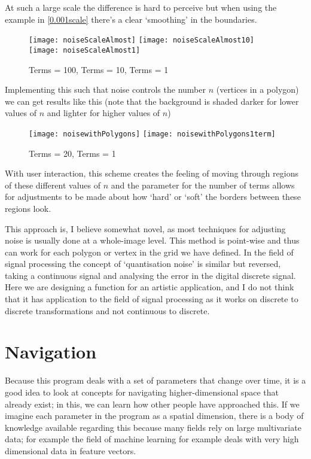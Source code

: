 At such a large scale the difference is hard to perceive but when using the
example in \autoref{0.001scale} there's a clear `smoothing' in the boundaries.

\begin{figure}[H]
\centering
\texttt{[image: noiseScaleAlmost]}
\hspace{0.2cm}
\texttt{[image: noiseScaleAlmost10]}
\hspace{0.2cm}
\texttt{[image: noiseScaleAlmost1]}
\caption{Terms = 100, Terms = 10, Terms = 1}
\end{figure}

Implementing this such that noise controls the number $n$ (vertices in a
polygon) we can get results like this (note that the background is shaded darker
for lower values of $n$ and lighter for higher values of $n$)
\begin{figure}[H]
\centering
\texttt{[image: noisewithPolygons]}
\hspace{0.2cm}
\texttt{[image: noisewithPolygons1term]}
\caption{Terms = 20, Terms = 1}
\end{figure}

With user interaction, this scheme creates the feeling of moving through regions
of these different values of $n$ and the parameter for the number of terms
allows for adjustments to be made about how `hard' or `soft' the borders between
these regions look.

This approach is, I believe somewhat novel, as most techniques for adjusting
noise is usually done at a whole-image level. This method is point-wise and thus
can work for each polygon or vertex in the grid we have defined. In the field of
signal processing the concept of `quantisation noise' is similar but reversed,
taking a continuous signal and analysing the error in the digital discrete
signal. Here we are designing a function for an artistic application, and I do
not think that it has application to the field of signal processing as it works
on discrete to discrete transformations and not continuous to discrete.

\section{Navigation}
Because this program deals with a set of parameters that change over time, it is
a good idea to look at concepts for navigating higher-dimensional space that
already exist; in this, we can learn how other people have approached this. If we
imagine each parameter in the program as a spatial dimension, there is a body of
knowledge available regarding this because many fields rely on large
multivariate data; for example the field of machine learning for example deals
with very high dimensional data in feature vectors.

